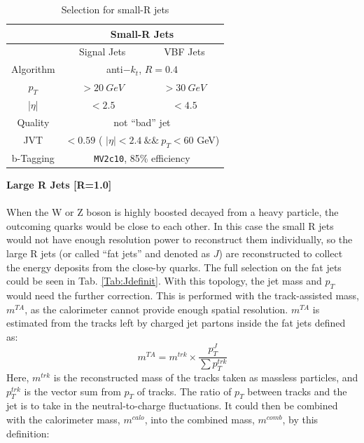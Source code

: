 \begin{table}[tbh]
	\caption{Selection for small-R jets}\label{tab:sjdefinit}
	\vspace{2.0em}
	\centering
	\begin{tabular}{|c||c|c|}
		\hline
		             & \multicolumn{2}{|c|}{ Small-R Jets }\\
		\hline
		             & Signal Jets & VBF Jets \\
		\hline
		Algorithm    & \multicolumn{2}{|c|}{ anti$-k_t$, $R=0.4$}\\
		\hline
		$p_T$        & $>20~GeV$ & $>30~GeV$\\
		\hline
		|$\eta$|     & $< 2.5$ & $<4.5$  \\
		\hline
		Quality      & \multicolumn{2}{|c|}{not ``bad'' jet}\\
		\hline
		JVT          & \multicolumn{2}{|c|}{$< 0.59$ ( $| \eta | < 2.4 ~ \& \& ~p_T < 60 $ GeV)} \\
		\hline
		b-Tagging    & \multicolumn{2}{|c|}{\texttt{MV2c10}, 85\% efficiency} \\
		\hline
	\end{tabular}
\end{table}
\noindent
{\bf Large R Jets [R=1.0]}
\\
\\When the W or Z boson is highly boosted decayed from a heavy particle, the outcoming quarks would be close to each other. In this case the small R jets would not have enough resolution power to reconstruct them individually, so the large R jets (or called ``fat jets'' and denoted as $J$) are reconstructed to collect the energy deposits from the close-by quarks. The full selection on the fat jets could be seen in Tab. \ref{Tab:Jdefinit}. With this topology, the jet mass and $p_{T}$ would need the further correction. This is performed with the track-assisted mass, $m^{TA}$\cite{ATLAS-CONF-2016-035}, as the calorimeter cannot provide enough spatial resolution. $m^{TA}$ is estimated from the tracks left by charged jet partons inside the fat jets defined as:
\begin{equation}
m^{TA} = m^{trk} \times \frac{p_{T}^{J}}{\sum p_{T}^{trk}}
\end{equation}  
Here, $m^{trk}$ is the reconstructed mass of the tracks taken as massless particles, and $p_{T}^{trk}$ is the vector sum from $p_{T}$ of tracks.  The ratio of $p_{T}$ between tracks and the jet is to take in the neutral-to-charge fluctuations. It could then be combined with the calorimeter mass, $m^{calo}$, into the combined mass, $m^{comb}$, by this definition:
